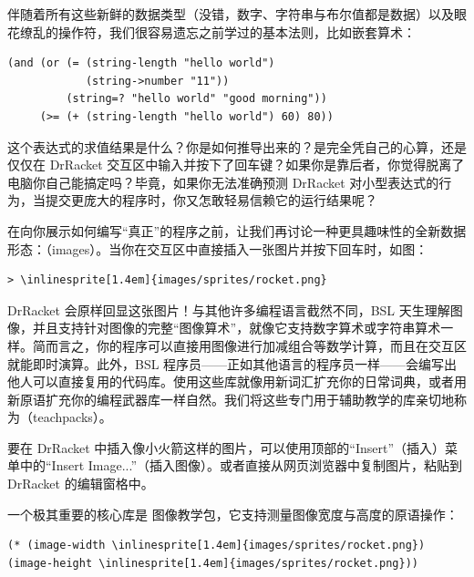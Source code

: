 伴随着所有这些新鲜的数据类型（没错，数字、字符串与布尔值都是数据）以及眼花缭乱的操作符，我们很容易遗忘之前学过的基本法则，比如嵌套算术：

\begin{lstlisting}[language=BSL]
(and (or (= (string-length "hello world")
            (string->number "11"))
         (string=? "hello world" "good morning"))
     (>= (+ (string-length "hello world") 60) 80))
\end{lstlisting}

这个表达式的求值结果是什么？你是如何推导出来的？是完全凭自己的心算，还是仅仅在 DrRacket 交互区中输入并按下了回车键？如果你是靠后者，你觉得脱离了电脑你自己能搞定吗？毕竟，如果你无法准确预测 DrRacket 对小型表达式的行为，当提交更庞大的程序时，你又怎敢轻易信赖它的运行结果呢？

在向你展示如何编写“真正”的程序之前，让我们再讨论一种更具趣味性的全新数据形态：（images）。当你在交互区中直接插入一张图片并按下回车时，如图：

\begin{stepperbox}
\begin{Verbatim}[commandchars=\\\{\}, fontsize=\footnotesize]
> \inlinesprite[1.4em]{images/sprites/rocket.png}
\end{Verbatim}
\end{stepperbox}

DrRacket 会原样回显这张图片！与其他许多编程语言截然不同，BSL 天生理解图像，并且支持针对图像的完整“图像算术”，就像它支持数字算术或字符串算术一样。简而言之，你的程序可以直接用图像进行加减组合等数学计算，而且在交互区就能即时演算。此外，BSL 程序员——正如其他语言的程序员一样——会编写出他人可以直接复用的代码库。使用这些库就像用新词汇扩充你的日常词典，或者用新原语扩充你的编程武器库一样自然。我们将这些专门用于辅助教学的库亲切地称为（teachpacks）。

\begin{notebox}
要在 DrRacket 中插入像小火箭这样的图片，可以使用顶部的“Insert”（插入）菜单中的“Insert Image...”（插入图像）。或者直接从网页浏览器中复制图片，粘贴到 DrRacket 的编辑窗格中。
\end{notebox}

一个极其重要的核心库是  图像教学包，它支持测量图像宽度与高度的原语操作：

\begin{stepperbox}
\begin{Verbatim}[commandchars=\\\{\}, fontsize=\footnotesize]
(* (image-width \inlinesprite[1.4em]{images/sprites/rocket.png}) (image-height \inlinesprite[1.4em]{images/sprites/rocket.png}))
\end{Verbatim}
\end{stepperbox}


